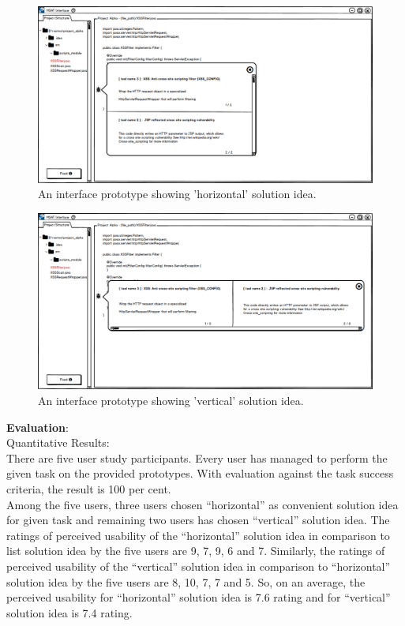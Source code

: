 \begin{figure}[hbt!]
	\centering
	\includegraphics[width=\linewidth]{figures/solution_ideas_snaps/S31_horizontal}
	\caption{An interface prototype showing 'horizontal' solution idea.}
	\label{fig:S31_horizontal3}
\end{figure} 


\begin{figure}[hbt!]
	\centering
	\includegraphics[width=\linewidth]{figures/solution_ideas_snaps/S31_vertical}
	\caption{An interface prototype showing 'vertical' solution idea.}
	\label{fig:S31_vertical3}
\end{figure} 


\textbf{Evaluation}: \\

Quantitative Results: \\

There are five user study participants. Every user has managed to perform the given task on the provided prototypes. With evaluation against the task success criteria, the result is 100 per cent. \\

Among the five users, three users chosen “horizontal” as convenient solution idea for given task and remaining two users has chosen “vertical” solution idea. The ratings of perceived usability of the “horizontal” solution idea in comparison to list solution idea by the five users are 9, 7, 9, 6 and 7. Similarly, the ratings of perceived usability of the “vertical” solution idea in comparison to “horizontal” solution idea by the five users are 8, 10, 7, 7 and 5. So, on an average, the perceived usability for “horizontal” solution idea is 7.6 rating and for “vertical” solution idea is 7.4 rating. \\


